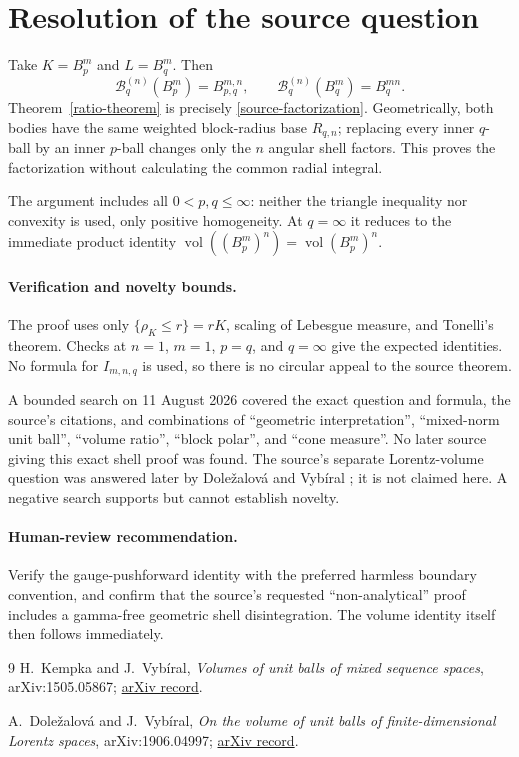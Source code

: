 \documentclass[11pt]{article}
\newcommand{\vol}{\operatorname{vol}}
\begin{document}
\section*{Resolution of the source question}
Take $K=B_p^m$ and $L=B_q^m$.  Then
\[
 \mathcal B_q^{(n)}(B_p^m)=B_{p,q}^{m,n},
 \qquad
 \mathcal B_q^{(n)}(B_q^m)=B_q^{mn}.
\]
Theorem~\ref{ratio-theorem} is precisely
\eqref{source-factorization}.  Geometrically, both bodies have the same
weighted block-radius base $R_{q,n}$; replacing every inner $q$-ball by an
inner $p$-ball changes only the $n$ angular shell factors.  This proves the
factorization without calculating the common radial integral.

The argument includes all $0<p,q\le\infty$: neither the triangle inequality
nor convexity is used, only positive homogeneity.  At $q=\infty$ it reduces to
the immediate product identity
$\vol((B_p^m)^n)=\vol(B_p^m)^n$.

\paragraph{Verification and novelty bounds.}
The proof uses only $\{\rho_K\le r\}=rK$, scaling of Lebesgue measure, and
Tonelli's theorem.  Checks at $n=1$, $m=1$, $p=q$, and $q=\infty$ give the
expected identities.  No formula for $I_{m,n,q}$ is used, so there is no
circular appeal to the source theorem.

A bounded search on 11 August 2026 covered the exact question and formula,
the source's citations, and combinations of ``geometric interpretation'',
``mixed-norm unit ball'', ``volume ratio'', ``block polar'', and ``cone
measure''.  No later source giving this exact shell proof was found.  The
source's separate Lorentz-volume question was answered later by
Dole\v{z}alov\'a and Vyb\'iral \cite{DV}; it is not claimed here.  A negative
search supports but cannot establish novelty.

\paragraph{Human-review recommendation.}
Verify the gauge-pushforward identity with the preferred harmless boundary
convention, and confirm that the source's requested ``non-analytical'' proof
includes a gamma-free geometric shell disintegration.  The volume identity
itself then follows immediately.

\small
\begin{thebibliography}{9}
H.~Kempka and J.~Vyb\'iral,
\emph{Volumes of unit balls of mixed sequence spaces},
arXiv:1505.05867; \href{https://arxiv.org/abs/1505.05867}{arXiv record}.

A.~Dole\v{z}alov\'a and J.~Vyb\'iral,
\emph{On the volume of unit balls of finite-dimensional Lorentz spaces},
arXiv:1906.04997; \href{https://arxiv.org/abs/1906.04997}{arXiv record}.
\end{thebibliography}
\end{document}
